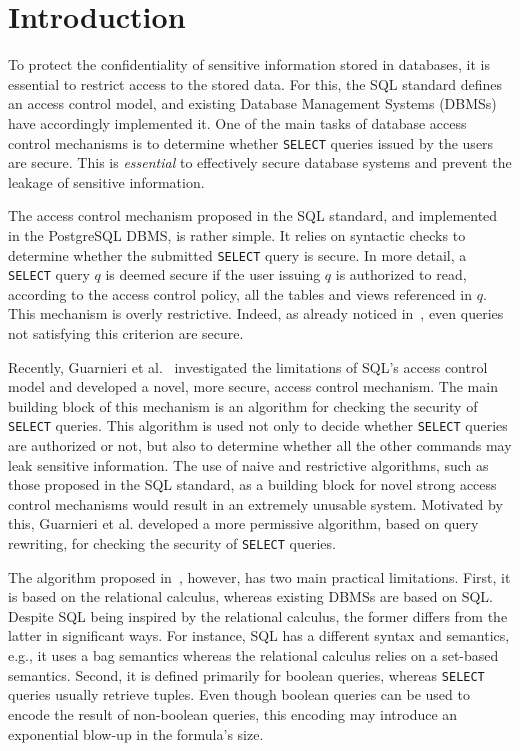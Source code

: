 \section{Introduction}
To protect the confidentiality of sensitive information stored in databases, it is essential to restrict access to the stored data.
%
For this, the SQL standard defines an access control model, and existing Database Management Systems (DBMSs) have accordingly implemented it. 
%
One of the main tasks of database access control mechanisms is to determine whether \texttt{SELECT} queries issued by the users are secure.
%
This is \emph{essential} to effectively secure database systems and prevent the leakage of sensitive information.

The access control mechanism proposed in the SQL standard, and implemented in the PostgreSQL DBMS, is rather simple.
%
It relies on syntactic checks to determine whether the submitted \texttt{SELECT} query is secure.
%
In more detail, a \texttt{SELECT} query $q$ is deemed secure if the user issuing $q$ is authorized to read, according to the access control policy, all the tables and views referenced in $q$. %
%
This mechanism is overly restrictive.
%
Indeed, as already noticed in~\cite{guarnieri2014optimal,rizvi2004extending, wang2007correctness,zhang2005authorizations}, even queries not satisfying this criterion are secure.

Recently, Guarnieri et al.~\cite{guarnieri2016strong} investigated the limitations of SQL's access control model and  developed a novel, more secure, access control mechanism.
%
The main building block of this mechanism is an algorithm for checking the security of \texttt{SELECT} queries.
%
This algorithm is used not only to decide whether \texttt{SELECT} queries are authorized or not, but also to determine whether all the other commands may leak sensitive information. 
%
The use of naive and restrictive algorithms, such as those proposed in the SQL standard, as a building block for novel strong access control mechanisms would result in an extremely unusable system.
%
Motivated by this, Guarnieri et al. developed a more permissive algorithm, based on query rewriting, for checking the security of \texttt{SELECT} queries.

The algorithm proposed in~\cite{guarnieri2016strong}, however, has two main practical limitations.
%
First, it is based on the relational calculus, whereas existing DBMSs are based on SQL. Despite SQL being inspired by the relational calculus, the former differs from the latter in significant ways. For instance, SQL has a different syntax and semantics, e.g., it uses a bag semantics whereas the relational calculus relies on a set-based semantics.
%
Second, it is defined primarily for boolean queries, whereas \texttt{SELECT} queries usually retrieve tuples.
%
Even though boolean queries can be used to encode the result of non-boolean queries, this encoding may introduce an exponential blow-up in the formula's size.

